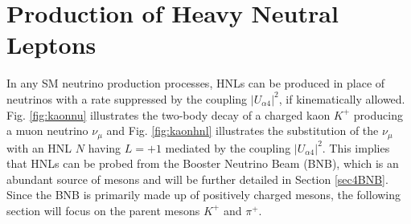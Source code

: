 
 
\section{Production of Heavy Neutral Leptons}
\label{sec2Production}
In any SM neutrino production processes, HNLs can be produced in place of neutrinos with a rate suppressed by the coupling $|U_{\alpha4}|^{2}$, if kinematically allowed. 
Fig. \ref{fig:kaonnu} illustrates the two-body decay of a charged kaon $K^+$ producing a muon neutrino $\nu_{\mu}$ and Fig. \ref{fig:kaonhnl} illustrates the substitution of the $\nu_{\mu}$ with an HNL $N$ having $L = +1$ mediated by the coupling $|U_{\alpha4}|^{2}$. 
This implies that HNLs can be probed from the Booster Neutrino Beam (BNB), which is an abundant source of mesons and will be further detailed in Section \ref{sec4BNB}.
Since the BNB is primarily made up of positively charged mesons, the following section will focus on the parent mesons $K^+$ and $\pi^+$.  

